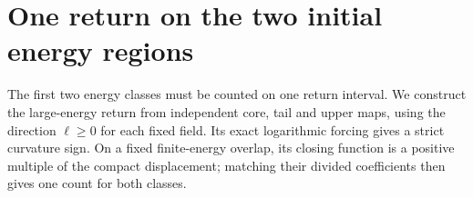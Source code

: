 \section{One return on the two initial energy regions}
\label{rw:source}

The first two energy classes must be counted on one return interval.
We construct the large-energy return from independent core, tail and
upper maps, using the direction $\ell\ge0$ for each fixed field.
Its exact logarithmic forcing gives a strict curvature sign. On a
fixed finite-energy overlap, its closing function is a positive
multiple of the compact displacement; matching their divided
coefficients then gives one count for both classes.



